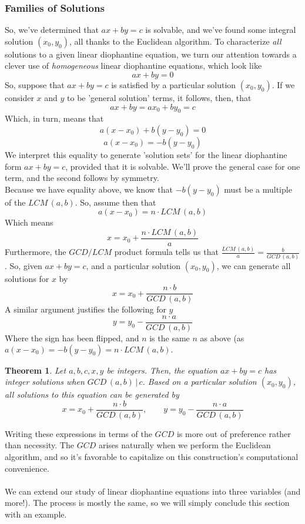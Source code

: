 \documentclass{article}
\newtheorem{theorem}{Theorem}
\newcommand{\divv}{\,|\,}
\newcommand{\GCD}[2]{GCD\,(#1, #2)}
\newcommand{\LCM}[2]{LCM\,(#1, #2)}
\begin{document}
\subsubsection*{Families of Solutions} 
So, we've determined that $ax + by = c$ is solvable, and we've found some integral solution $(x_0, y_0)$, all thanks to the Euclidean algorithm. To characterize \textit{all} solutions to a given linear diophantine equation, we turn our attention towards a clever use of \textit{homogeneous} linear diophantine equations, which look like 
\[ax + by = 0\] 
So, suppose that $ax + by = c$ is satisfied by a particular solution $(x_0, y_0)$. If we consider $x$ and $y$ to be 'general solution' terms, it follows, then, that 
\[ax + by = ax_0 + by_0 = c\]
Which, in turn, means that 
\[a(x-x_0) + b(y - y_0) = 0\]
\[a(x-x_0) = - b(y - y_0)\]
We interpret this equality to generate 'solution sets' for the linear diophantine form $ax +by = c$, provided that it is solvable. We'll prove the general case for one term, and the second follows by symmetry. \\
Because we have equality above, we know that $-b(y-y_0)$ must be a multiple of the $\LCM{a}{b}$. So, assume then that 
\[a(x - x_0) = n \cdot \LCM{a}{b} \]
Which means 
\[x = x_0 + \frac{n\cdot\LCM{a}{b}}{a}\]
Furthermore, the $GCD/LCM$ product formula tells us that $\frac{\LCM{a}{b}}{a} = \frac{b}{\GCD{a}{b}}$. So, given $ax + by = c$, and a particular solution $(x_0, y_0)$, we can generate all solutions for $x$ by 
\[x = x_0 + \frac{n\cdot b}{\GCD{a}{b}}\]
A similar argument justifies the following for $y$ 
\[y = y_0 - \frac{n\cdot a}{\GCD{a}{b}}\] 
Where the sign has been flipped, and $n$ is the same $n$ as above (as $a(x-x_0) = -b(y - y_0) = n \cdot \LCM{a}{b}.$
\begin{mdframed}  
\begin{theorem} 
Let $a, b, c, x, y$ be integers. Then, the equation $ax + by = c$ has integer solutions when $\GCD{a}{b}\divv c$. Based on a particular solution $(x_0, y_0)$, all solutions to this equation can be generated by 
\[x = x_0 + \frac{n\cdot b}{\GCD{a}{b}}, \qquad y = y_0 - \frac{n\cdot a}{\GCD{a}{b}}\]
\end{theorem} 
\end{mdframed} 
Writing these expressions in terms of the $GCD$ is more out of preference rather than necessity. The $GCD$ arises naturally when we perform the Euclidean algorithm, and so it's favorable to capitalize on this construction's computational convenience.\\\\ We can extend our study of linear diophantine equations into three variables (and more!). The process is mostly the same, so we will simply conclude this section with an example.  
\end{document}

